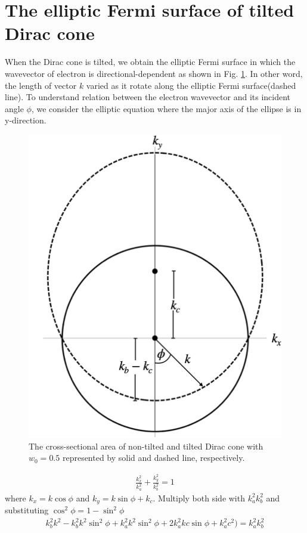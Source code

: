 \section{The elliptic Fermi surface of tilted Dirac cone} \label{sec:elliptic fermi surface}
    When the Dirac cone is tilted, we obtain the elliptic Fermi surface in which the wavevector of electron is directional-dependent as shown in Fig. \ref{fig:elliptic fermi surface}.
    In other word, the length of vector $k$ varied as it rotate along the elliptic Fermi surface(dashed line).
    To understand relation between the electron wavevector and its incident angle $\phi$, we consider the elliptic equation where the major axis of the ellipse is in y-direction.
    \begin{figure}[H]
        \centering
        \includegraphics[width = 0.5\linewidth]{fig/elliptic fermi surface.png}
        \caption{The cross-sectional area of non-tilted and tilted Dirac cone with $w_0 = 0.5$ represented by solid and dashed line, respectively.}
        \label{fig:elliptic fermi surface}
    \end{figure}
    \begin{align} \label{eq:elliptic eq}
        \frac{k_x^2}{k_a^2} + \frac{k_y^2}{k_b^2} = 1
    \end{align}
    where $k_x = k\cos{\phi}$ and $k_y = k\sin{\phi} + k_c$. Multiply both side with $k_a^2 k_b^2$ and substituting $\cos^2{\phi} = 1 - \sin^2{\phi}$
    \begin{equation}
        \begin{aligned}
            k_b^2 k^2 -k_b^2 k^2 \sin^2{\phi} + k_a^2k^2 \sin^2{\phi}+2 k_a^2 k c \sin{\phi} +k_a^2 c^2)=k_a^2 k_b^2
        \end{aligned}
    \end{equation}
